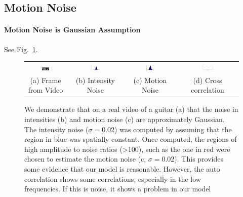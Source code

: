 \documentclass[letterpaper, 10pt]{article}
\numberwithin{equation}{section}
\begin{document}
\subsection{Motion Noise}



\paragraph{Motion Noise is Gaussian Assumption}  See Fig.~\ref{fig:motionNoise}.
\begin{figure}
\begin{tabular}{cccc}
\includegraphics[width=0.2\textwidth]{motionNoiseGaussian/guitar.pdf} &
\includegraphics[width=0.2\textwidth]{motionNoiseGaussian/imageNoiseHistogram.eps} &
\includegraphics[width=0.2\textwidth]{motionNoiseGaussian/motionNoiseHistogram.eps} &
\includegraphics[width=0.2\textwidth]{motionNoiseGaussian/crossCorrelation.eps} \\
(a) Frame from Video & (b) Intensity Noise & (c) Motion Noise & (d) Cross correlation\\
\end{tabular}
\caption{We demonstrate that on a real video of a guitar (a) that the noise in intensities (b) and motion noise (c) are approximately Gaussian. The intensity noise ($\sigma = 0.02$) was computed by assuming that the region in blue was spatially constant. Once computed, the regions of high amplitude to noise ratios (>100), such as the one in red were chosen to estimate the motion noise (c, $\sigma=0.02$). This provides some evidence that our model is reasonable. However, the auto correlation shows some correlations, especially in the low frequencies. If this is noise, it shows a problem in our model}
\label{fig:motionNoise}
\end{figure}
\end{document}
